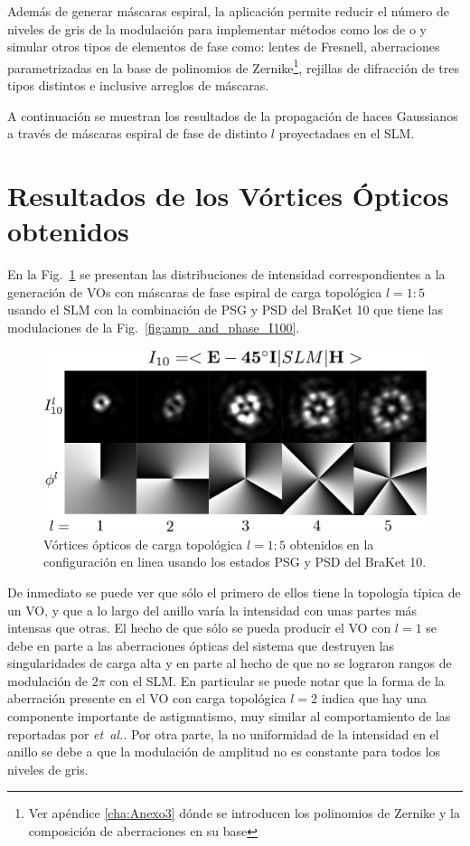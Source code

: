 Además de generar máscaras espiral, la aplicación permite reducir el
número de niveles de gris de la modulación para implementar métodos
como los de  o  y simular
otros tipos de elementos de fase como: lentes de Fresnell, aberraciones
parametrizadas en la base de polinomios de Zernike\footnote{Ver apéndice
  \ref{cha:Anexo3} dónde se introducen los polinomios de Zernike y la
  composición de aberraciones en su base}, rejillas de difracción de
tres tipos distintos e
inclusive arreglos de máscaras.

A continuación se muestran los resultados de la propagación de haces
Gaussianos a través de máscaras espiral de fase de distinto $l$
proyectadaes en el SLM. 

\section{Resultados de los Vórtices Ópticos obtenidos}

En la Fig.~\ref{fig:VOs_I10} se presentan las distribuciones de
intensidad correspondientes a la generación de VOs con máscaras de
fase espiral de carga topológica $l=1:5$ usando el SLM con la
combinación de PSG y PSD del BraKet 10 que tiene las modulaciones de
la Fig.~\ref{fig:amp_and_phase_I100}. 
\begin{figure}[h!]
\centering
\includegraphics[scale=0.4]{OV_I10.pdf}
\caption[Vórtices ópticos obtenidos en la configuración en linea para
el BraKet 10]{Vórtices ópticos de carga topológica $l=1:5$ obtenidos
  en la configuración en linea usando los estados PSG y PSD del BraKet 10.} 
\label{fig:VOs_I10}
\end{figure}
De inmediato se puede ver que sólo el primero de ellos tiene la
topología típica de un VO, y que a lo largo del anillo varía la
intensidad con unas partes más intensas que otras. El hecho de que
sólo se pueda producir el VO con $l=1$ se debe en parte a las
aberraciones ópticas del sistema que destruyen las singularidades de
carga alta y en parte al hecho de que no se
lograron rangos de modulación de $2\pi$ con el SLM. En particular se
puede notar que la forma de la aberración presente en el VO
con carga topológica $l=2$ indica que hay una componente importante de
astigmatismo, muy similar al comportamiento de las reportadas por  \textit{et~al.}. Por otra parte, la
no uniformidad de la intensidad en el anillo se debe a que
la modulación de amplitud no es constante para todos los niveles de
gris. 

